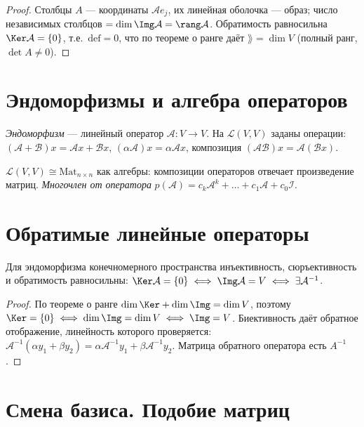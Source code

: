 \begin{proof}
Столбцы $A$ — координаты $\mathcal Ae_j$, их линейная оболочка — образ; число независимых столбцов
$=\dim\Img\mathcal A=\rang\mathcal A$. Обратимость равносильна $\Ker\mathcal A=\{0\}$, т.е.\
$\mathrm{def}=0$, что по теореме о ранге даёт $\rang=\dim V$ (полный ранг, $\det A\ne0$).
\end{proof}

\section{Эндоморфизмы и алгебра операторов}

\begin{definition}
\emph{Эндоморфизм} — линейный оператор $\mathcal A\colon V\to V$. На $\mathcal L(V,V)$ заданы
операции: $(\mathcal A+\mathcal B)x=\mathcal Ax+\mathcal Bx$, $(\alpha\mathcal A)x=\alpha\mathcal Ax$,
композиция $(\mathcal A\mathcal B)x=\mathcal A(\mathcal Bx)$.
\end{definition}

\begin{remark}
$\mathcal L(V,V)\cong\mathrm{Mat}_{n\times n}$ как алгебры: композиции операторов отвечает
произведение матриц. \emph{Многочлен от оператора}
$p(\mathcal A)=c_k\mathcal A^k+\dots+c_1\mathcal A+c_0\mathcal I$.
\end{remark}

\section{Обратимые линейные операторы}

\begin{theorem}
Для эндоморфизма конечномерного пространства инъективность, сюръективность и обратимость
равносильны: $\Ker\mathcal A=\{0\}\iff\Img\mathcal A=V\iff\exists\mathcal A^{-1}$.
\end{theorem}

\begin{proof}
По теореме о ранге $\dim\Ker+\dim\Img=\dim V$, поэтому $\Ker=\{0\}\iff\dim\Img=\dim V\iff\Img=V$.
Биективность даёт обратное отображение, линейность которого проверяется:
$\mathcal A^{-1}(\alpha y_1+\beta y_2)=\alpha\mathcal A^{-1}y_1+\beta\mathcal A^{-1}y_2$. Матрица
обратного оператора есть $A^{-1}$.
\end{proof}

\section{Смена базиса. Подобие матриц}

